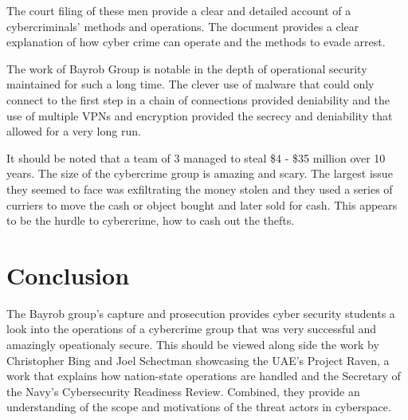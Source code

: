 \documentclass[fleqn,12pt]{SelfArx} %
\begin{document}
The court filing of these men provide a clear and detailed account of a cybercriminals’ methods and operations. \cite{Gaughan:Court:Nicolescu}  The document provides a clear explanation of how cyber crime can operate and the methods to evade arrest.

The work of Bayrob Group is notable in the depth of operational security maintained for such a long time.  The clever use of malware that could only connect to the first step in a chain of connections provided deniability and the use of multiple VPNs and encryption provided the secrecy and deniability that allowed for a very long run.

It should be noted that a team of 3 managed to steal \$4 - \$35 million over 10 years.  The size of the cybercrime group is amazing and scary.  The largest issue they seemed to face was exfiltrating the money stolen and they used a series of curriers to move the cash or object bought and later sold for cash.  This appears to be the hurdle to cybercrime, how to cash out the thefts. 


\section*{Conclusion} 

The Bayrob group's capture\cite{Symantech:Blog:Bayrob} and prosecution \cite{Gaughan:Court:Nicolescu} provides cyber security students a look into the operations of a cybercrime group that was very successful and amazingly opeationaly secure.  This should be viewed along side the work by Christopher Bing and Joel Schectman showcasing the UAE's Project Raven\cite{Bing:Reuters:UAERaven}, a work that explains how nation-state operations are handled and the Secretary of the Navy's Cybersecurity Readiness Review\cite{Navy:ReadRev}. Combined, they provide an understanding of the scope and motivations of the threat actors in cyberspace. 
\end{document}
